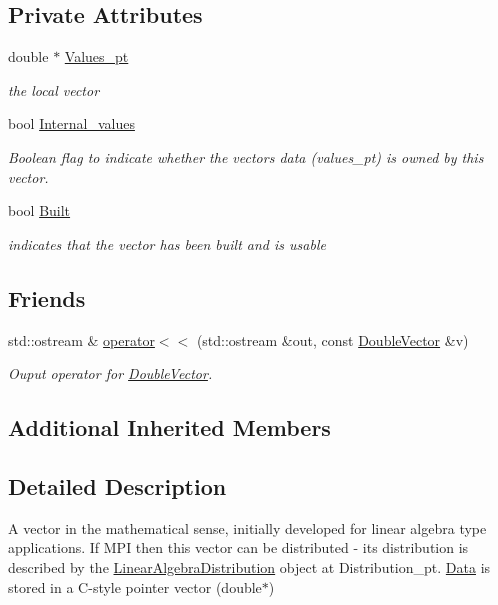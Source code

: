 \subsection*{Private Attributes}
\begin{DoxyCompactItemize}
\item 
double $\ast$ \hyperlink{classoomph_1_1DoubleVector_abbb699b9364ece68a4cb483291c04c25}{Values\+\_\+pt}
\begin{DoxyCompactList}\small\item\em the local vector \end{DoxyCompactList}\item 
bool \hyperlink{classoomph_1_1DoubleVector_a9b205077360d67c9de07e538199f335f}{Internal\+\_\+values}
\begin{DoxyCompactList}\small\item\em Boolean flag to indicate whether the vector\textquotesingle{}s data (values\+\_\+pt) is owned by this vector. \end{DoxyCompactList}\item 
bool \hyperlink{classoomph_1_1DoubleVector_ab72c78c801b28fdd00391a9c266413ea}{Built}
\begin{DoxyCompactList}\small\item\em indicates that the vector has been built and is usable \end{DoxyCompactList}\end{DoxyCompactItemize}
\subsection*{Friends}
\begin{DoxyCompactItemize}
\item 
std\+::ostream \& \hyperlink{classoomph_1_1DoubleVector_a738e90fa5474b2ab868b50d76347a20d}{operator$<$$<$} (std\+::ostream \&out, const \hyperlink{classoomph_1_1DoubleVector}{Double\+Vector} \&v)
\begin{DoxyCompactList}\small\item\em Ouput operator for \hyperlink{classoomph_1_1DoubleVector}{Double\+Vector}. \end{DoxyCompactList}\end{DoxyCompactItemize}
\subsection*{Additional Inherited Members}


\subsection{Detailed Description}
A vector in the mathematical sense, initially developed for linear algebra type applications. If M\+PI then this vector can be distributed -\/ its distribution is described by the \hyperlink{classoomph_1_1LinearAlgebraDistribution}{Linear\+Algebra\+Distribution} object at Distribution\+\_\+pt. \hyperlink{classoomph_1_1Data}{Data} is stored in a C-\/style pointer vector (double$\ast$) 

